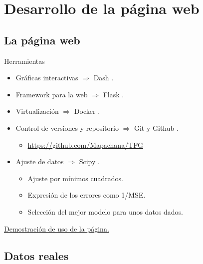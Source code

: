 

\section{Desarrollo de la página web}


\subsection{La página web}


\begin{frame}{Herramientas}

    \begin{itemize}
        \item Gráficas interactivas $\Rightarrow$ Dash \cite{dash}.
        \pause
        \item Framework para la web $\Rightarrow$ Flask \cite{flask}.
        \pause
        \item Virtualización $\Rightarrow$ Docker \cite{docker}.
        \pause
        \item Control de versiones y repositorio $\Rightarrow$ Git y Github \cite{git}.
        \begin{itemize}
            \item \href{https://github.com/Mapachana/TFG}{https://github.com/Mapachana/TFG}
        \end{itemize}
        \pause
        \item Ajuste de datos $\Rightarrow$ Scipy \cite{scipy_curvefit}.
        \begin{itemize}
            \item Ajuste por mínimos cuadrados.
            \item Expresión de los errores como 1/MSE.
            \item Selección del mejor modelo para unos datos dados.
        \end{itemize}
    \end{itemize}

    \pause

    \href{run:/home/mapachana/2022-06-23 19-38-25.mkv}{Demostración de uso de la página.}

\end{frame}


\subsection{Datos reales}


